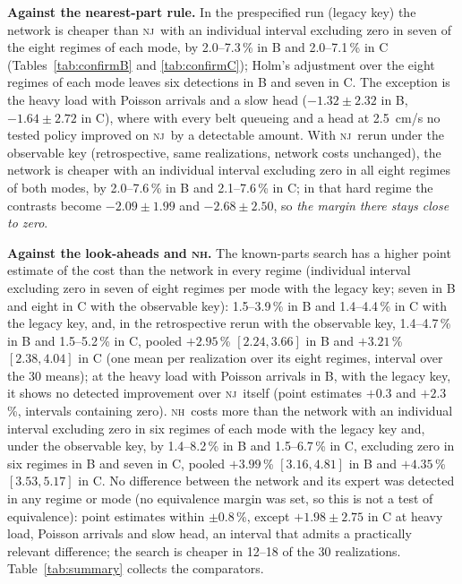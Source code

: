 \documentclass[11pt,a4paper]{article}
\theoremstyle{plain}
\theoremstyle{definition}
\theoremstyle{remark}
\newcommand{\nj}{\textsc{nj}}
\newcommand{\nh}{\textsc{nh}}
\begin{document}
\begin{table}[t]
\centering\small
\caption{As Table~\ref{tab:confirmB}, design mode (C): every policy, including \nj, may
pre-position the idle head. Legacy tie-break; seeds 7000--7029, shared with the companion
paper.}
\label{tab:confirmC}
\resizebox{\linewidth}{!}{}
\end{table}

\textbf{Against the nearest-part rule.} In the prespecified run (legacy key) the network is
cheaper than \nj\ with an individual interval excluding zero in seven of the eight regimes
of each mode, by 2.0--7.3\,\% in B and 2.0--7.1\,\% in C (Tables~\ref{tab:confirmB} and
\ref{tab:confirmC}); Holm's adjustment over the eight regimes of each mode leaves six
detections in B and seven in C. The exception is the heavy load with Poisson arrivals and a
slow head ($-1.32\pm2.32$ in B, $-1.64\pm2.72$ in C), where with every belt queueing and a
head at 2.5~cm/s no tested policy improved on \nj\ by a detectable amount. With \nj\ rerun
under the observable key (retrospective, same realizations, network costs unchanged), the
network is cheaper with an individual interval excluding zero in all eight regimes of both
modes, by 2.0--7.6\,\% in B and 2.1--7.6\,\% in C; in that hard regime the contrasts become
$-2.09\pm1.99$ and $-2.68\pm2.50$, so \emph{the margin there stays close to zero}.

\textbf{Against the look-aheads and \nh.} The known-parts search has a higher point estimate of the cost than the
network in every regime (individual interval excluding zero in seven of eight regimes per
mode with the legacy key; seven in B and eight in C with the observable key): 1.5--3.9\,\% in B and 1.4--4.4\,\% in C with the legacy key, and, in the
retrospective rerun with the observable key, 1.4--4.7\,\% in B and 1.5--5.2\,\% in C, pooled
$+2.95$\,\% $[2.24,3.66]$ in B and $+3.21$\,\% $[2.38,4.04]$ in C (one mean per realization
over its eight regimes, interval over the 30 means); at the heavy load with Poisson arrivals
in B, with the legacy key, it shows no detected improvement over \nj\ itself (point
estimates $+0.3$ and $+2.3$\,\%, intervals containing zero). \nh\ costs more than the network with
an individual interval excluding zero in six regimes of each mode with the legacy key and,
under the observable key, by 1.4--8.2\,\% in B and 1.5--6.7\,\% in C, excluding zero in six
regimes in B and seven in C, pooled $+3.99$\,\% $[3.16,4.81]$ in B and $+4.35$\,\%
$[3.53,5.17]$ in C.
No difference between the network and its expert was detected in any regime or mode (no
equivalence margin was set, so this is not a test of equivalence): point estimates within
$\pm0.8$\,\%, except $+1.98\pm2.75$ in C at heavy load, Poisson arrivals and slow head, an
interval that admits a practically relevant difference; the search is cheaper in 12--18 of
the 30 realizations. Table~\ref{tab:summary} collects the comparators.
\end{document}
